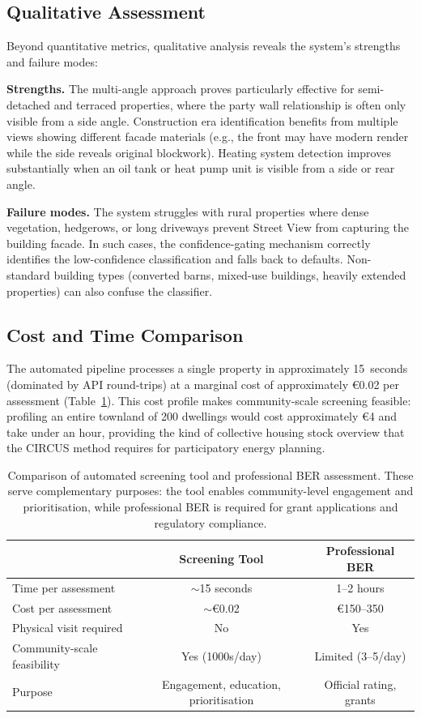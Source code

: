 \documentclass[preprint,12pt,authoryear]{elsarticle}
\begin{document}
\subsection{Qualitative Assessment}

Beyond quantitative metrics, qualitative analysis reveals the system's strengths and failure modes:

\textbf{Strengths.} The multi-angle approach proves particularly effective for semi-detached and terraced properties, where the party wall relationship is often only visible from a side angle. Construction era identification benefits from multiple views showing different facade materials (e.g., the front may have modern render while the side reveals original blockwork). Heating system detection improves substantially when an oil tank or heat pump unit is visible from a side or rear angle.

\textbf{Failure modes.} The system struggles with rural properties where dense vegetation, hedgerows, or long driveways prevent Street View from capturing the building facade. In such cases, the confidence-gating mechanism correctly identifies the low-confidence classification and falls back to defaults. Non-standard building types (converted barns, mixed-use buildings, heavily extended properties) can also confuse the classifier.

\subsection{Cost and Time Comparison}

The automated pipeline processes a single property in approximately 15~seconds (dominated by API round-trips) at a marginal cost of approximately \euro{}0.02 per assessment (Table~\ref{tab:cost}). This cost profile makes community-scale screening feasible: profiling an entire townland of 200 dwellings would cost approximately \euro{}4 and take under an hour, providing the kind of collective housing stock overview that the CIRCUS method requires for participatory energy planning.

\begin{table}[htbp]
\centering
\caption{Comparison of automated screening tool and professional BER assessment. These serve complementary purposes: the tool enables community-level engagement and prioritisation, while professional BER is required for grant applications and regulatory compliance.}
\label{tab:cost}
\begin{tabular}{@{}lcc@{}}
\toprule
 & Screening Tool & Professional BER \\
\midrule
Time per assessment    & $\sim$15 seconds  & 1--2 hours \\
Cost per assessment    & $\sim$\euro{}0.02  & \euro{}150--350 \\
Physical visit required & No               & Yes \\
Community-scale feasibility & Yes (1000s/day) & Limited (3--5/day) \\
Purpose                & Engagement, education, prioritisation & Official rating, grants \\
\bottomrule
\end{tabular}
\end{table}
\end{document}
